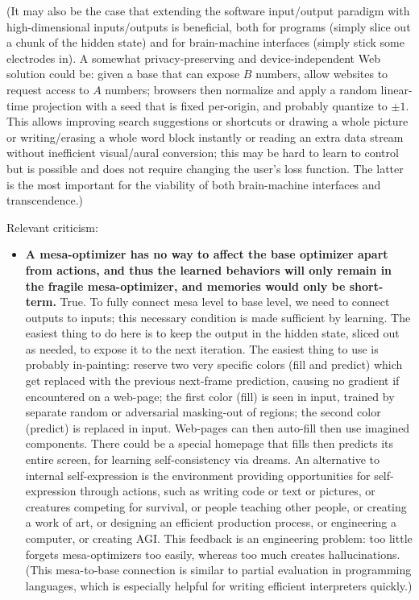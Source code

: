 \documentclass{article}
\begin{document}
\begin{itemize}
(It may also be the case that extending the software input/output paradigm with high-dimensional inputs/outputs is beneficial, both for programs (simply slice out a chunk of the hidden state) and for brain-machine interfaces (simply stick some electrodes in). A somewhat privacy-preserving and device-independent Web solution could be: given a base that can expose $B$ numbers, allow websites to request access to $A$ numbers; browsers then normalize and apply a random linear-time projection with a seed that is fixed per-origin, and probably quantize to $\pm1$. This allows improving search suggestions or shortcuts or drawing a whole picture or writing/erasing a whole word block instantly or reading an extra data stream without inefficient visual/aural conversion; this may be hard to learn to control but is possible and does not require changing the user's loss function. The latter is the most important for the viability of both brain-machine interfaces and transcendence.)
\end{itemize}

Relevant criticism:

\begin{itemize}
\item \textbf{A mesa-optimizer has no way to affect the base optimizer apart from actions, and thus the learned behaviors will only remain in the fragile mesa-optimizer, and memories would only be short-term.} True. To fully connect mesa level to base level, we need to connect outputs to inputs; this necessary condition is made sufficient by learning. The easiest thing to do here is to keep the output in the hidden state, sliced out as needed, to expose it to the next iteration. The easiest thing to use is probably in-painting: reserve two very specific colors (fill and predict) which get replaced with the previous next-frame prediction, causing no gradient if encountered on a web-page; the first color (fill) is seen in input, trained by separate random or adversarial masking-out of regions; the second color (predict) is replaced in input. Web-pages can then auto-fill then use imagined components. There could be a special homepage that fills then predicts its entire screen, for learning self-consistency via dreams. An alternative to internal self-expression is the environment providing opportunities for self-expression through actions, such as writing code or text or pictures, or creatures competing for survival, or people teaching other people, or creating a work of art, or designing an efficient production process, or engineering a computer, or creating AGI. This feedback is an engineering problem: too little forgets mesa-optimizers too easily, whereas too much creates hallucinations. (This mesa-to-base connection is similar to partial evaluation in programming languages, which is especially helpful for writing efficient interpreters quickly.)
\end{itemize}
\end{document}
